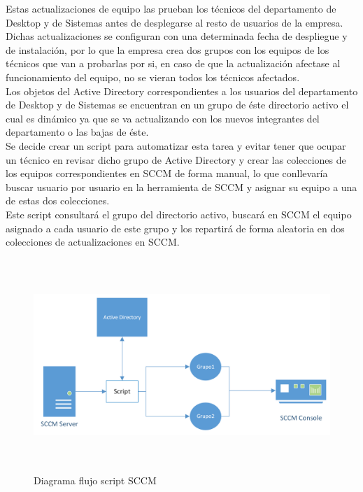 \documentclass[a4paper, 12pt]{book}
\begin{document}
Estas actualizaciones de equipo las prueban los técnicos del departamento de Desktop y de Sistemas antes de desplegarse al resto de usuarios de la empresa. Dichas actualizaciones se configuran con una determinada fecha de despliegue y de instalación, por lo que la empresa crea dos grupos con los equipos de los técnicos que van a probarlas por si, en caso de que la actualización afectase al funcionamiento del equipo, no se vieran todos los técnicos afectados.
\\

Los objetos del Active Directory correspondientes a los usuarios del departamento de Desktop y de Sistemas se encuentran en un grupo de éste directorio activo el cual es dinámico ya que se va actualizando con los nuevos integrantes del departamento o las bajas de éste.
\\

Se decide crear un script para automatizar esta tarea y evitar tener que ocupar un técnico en revisar dicho grupo de Active Directory y crear las colecciones de los equipos correspondientes en SCCM de forma manual, lo que conllevaría buscar usuario por usuario en la herramienta de SCCM y asignar su equipo a una de estas dos colecciones.
\\

Este script consultará el grupo del directorio activo, buscará en SCCM el equipo asignado a cada usuario de este grupo y los repartirá de forma aleatoria en dos colecciones de actualizaciones en SCCM.

\begin{figure}[H]
	\centering
	\includegraphics[width=15cm, height=8cm, keepaspectratio]{img/SCCM_diagrama.png}
	\caption{Diagrama flujo script SCCM}
	\label{fig:SCCM_diagrama}
\end{figure}
\end{document}
